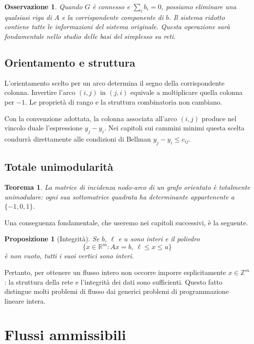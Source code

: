 \documentclass[11pt,a4paper]{article}
\newtheorem{theorem}[definition]{Teorema}
\newtheorem{proposition}[definition]{Proposizione}
\newtheorem{observation}[definition]{Osservazione}
\newcommand{\R}{\mathbb{R}}
\newcommand{\Z}{\mathbb{Z}}
\begin{document}
\begin{observation}
Quando $G$ è connesso e $\sum_i b_i=0$, possiamo eliminare una qualsiasi riga di $A$ e la corrispondente componente di $b$. Il sistema ridotto contiene tutte le informazioni del sistema originale. Questa operazione sarà fondamentale nello studio delle basi del simplesso su reti.
\end{observation}

\subsection{Orientamento e struttura}

L'orientamento scelto per un arco determina il segno della corrispondente colonna. Invertire l'arco $(i,j)$ in $(j,i)$ equivale a moltiplicare quella colonna per $-1$. Le proprietà di rango e la struttura combinatoria non cambiano.

Con la convenzione adottata, la colonna associata all'arco $(i,j)$ produce nel vincolo duale l'espressione $y_j-y_i$. Nei capitoli sui cammini minimi questa scelta condurrà direttamente alle condizioni di Bellman $y_j-y_i\le c_{ij}$.

\subsection{Totale unimodularità}

\begin{theorem}
La matrice di incidenza nodo-arco di un grafo orientato è totalmente unimodulare: ogni sua sottomatrice quadrata ha determinante appartenente a $\{-1,0,1\}$.
\end{theorem}

Una conseguenza fondamentale, che useremo nei capitoli successivi, è la seguente.

\begin{proposition}[Integrità]
Se $b$, $\ell$ e $u$ sono interi e il poliedro
\[
  \{x\in\R^m: Ax=b,\ \ell\le x\le u\}
\]
è non vuoto, tutti i suoi vertici sono interi.
\end{proposition}

Pertanto, per ottenere un flusso intero non occorre imporre esplicitamente $x\in\Z^m$: la struttura della rete e l'integrità dei dati sono sufficienti. Questo fatto distingue molti problemi di flusso dai generici problemi di programmazione lineare intera.

\section{Flussi ammissibili}
\end{document}
